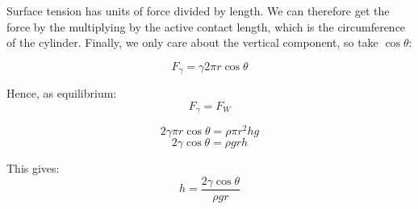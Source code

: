 Surface tension has units of force divided by length. We can therefore get the force by the multiplying by the active contact length, which is the circumference of the cylinder. Finally, we only care about the vertical component, so take $\cos \theta$:

\[
    F_\gamma = \gamma 2 \pi r \cos \theta
\]

Hence, as equilibrium:
\[
    F_\gamma = F_W
\]

\[
    2 \gamma \pi r \cos \theta = \rho \pi r^2 h g
\]
\[
    2 \gamma \cos \theta = \rho g r h
\]

This gives:
\[
    \boxed{h = \frac{2 \gamma \cos \theta}{\rho g r}}
\]
